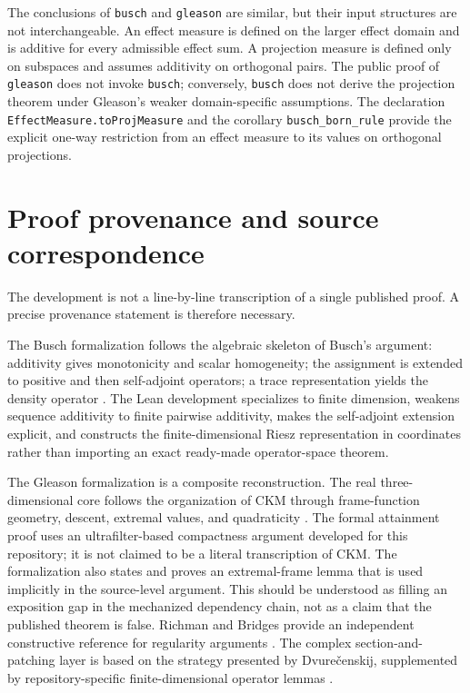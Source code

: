\documentclass[pdflatex,sn-mathphys-num]{sn-jnl}
\providecommand{\passthrough}[1]{#1}
\theoremstyle{thmstyleone}
\theoremstyle{thmstylethree}
\begin{document}
The conclusions of \passthrough{\lstinline!busch!} and \passthrough{\lstinline!gleason!} are similar, but their input structures are not interchangeable. An effect measure is defined on the larger effect domain and is additive for every admissible effect sum. A projection measure is defined only on subspaces and assumes additivity on orthogonal pairs. The public proof of \passthrough{\lstinline!gleason!} does not invoke \passthrough{\lstinline!busch!}; conversely, \passthrough{\lstinline!busch!} does not derive the projection theorem under Gleason's weaker domain-specific assumptions. The declaration \passthrough{\lstinline!EffectMeasure.toProjMeasure!} and the corollary \passthrough{\lstinline!busch_born_rule!} provide the explicit one-way restriction from an effect measure to its values on orthogonal projections.

\section{Proof provenance and source correspondence}\label{sec:provenance}

The development is not a line-by-line transcription of a single published proof. A precise provenance statement is therefore necessary.

The Busch formalization follows the algebraic skeleton of Busch's argument: additivity gives monotonicity and scalar homogeneity; the assignment is extended to positive and then self-adjoint operators; a trace representation yields the density operator \cite{busch2003}. The Lean development specializes to finite dimension, weakens sequence additivity to finite pairwise additivity, makes the self-adjoint extension explicit, and constructs the finite-dimensional Riesz representation in coordinates rather than importing an exact ready-made operator-space theorem.

The Gleason formalization is a composite reconstruction. The real three-dimensional core follows the organization of CKM through frame-function geometry, descent, extremal values, and quadraticity \cite{cooke1985}. The formal attainment proof uses an ultrafilter-based compactness argument developed for this repository; it is not claimed to be a literal transcription of CKM. The formalization also states and proves an extremal-frame lemma that is used implicitly in the source-level argument. This should be understood as filling an exposition gap in the mechanized dependency chain, not as a claim that the published theorem is false. Richman and Bridges provide an independent constructive reference for regularity arguments \cite{richman1999}. The complex section-and-patching layer is based on the strategy presented by Dvure\v{c}enskij, supplemented by repository-specific finite-dimensional operator lemmas \cite{dvurecenskij1993}.
\end{document}
